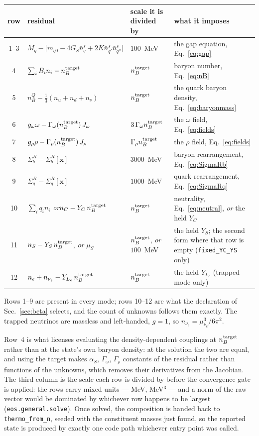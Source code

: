 \documentclass[aps,prc,onecolumn,superscriptaddress,nofootinbib,10pt]{revtex4-2}
\newcommand{\nB}{n_B}
\newcommand{\nC}{n_C}
\newcommand{\nS}{n_S}
\newcommand{\muS}{\mu_S}
\newcommand{\nbs}{\bar{n}^s}
\newcommand{\SR}{\Sigma^{R}}
\begin{document}
\begin{center}
\begin{tabular}{clll}
\toprule
row & residual & scale it is divided by & what it imposes \\
\midrule
1--3 & $M_q - \big[m_{q0} - 4G_S\nbs_q + 2K\nbs_{q'}\nbs_{q''}\big]$
     & $100$~MeV
     & the gap equation, Eq.~\eqref{eq:gap} \\
4 & $\sum_i B_i n_i - \nB^{\rm target}$
     & $\nB^{\rm target}$
     & baryon number, Eq.~\eqref{eq:nB} \\
5 & $\nB^{Q} - \tfrac13(n_u + n_d + n_s)$
     & $\nB^{\rm target}$
     & the quark baryon density, Eq.~\eqref{eq:baryonmass} \\
6 & $g_\omega\omega - \Gamma_\omega(\nB^{\rm target})\, J_\omega$
     & $3\,\Gamma_\omega \nB^{\rm target}$
     & the $\omega$ field, Eq.~\eqref{eq:fields} \\
7 & $g_\rho\rho - \Gamma_\rho(\nB^{\rm target})\, J_\rho$
     & $\Gamma_\rho \nB^{\rm target}$
     & the $\rho$ field, Eq.~\eqref{eq:fields} \\
8 & $\SR_b - \SR_b[\mathbf{x}]$
     & $3000$~MeV
     & baryon rearrangement, Eq.~\eqref{eq:SigmaRb} \\
9 & $\SR_q - \SR_q[\mathbf{x}]$
     & $1000$~MeV
     & quark rearrangement, Eq.~\eqref{eq:SigmaRq} \\
\midrule
10 & $\sum_i q_i n_i$ \quad\emph{or}\quad $\nC - Y_C\,\nB^{\rm target}$
     & $\nB^{\rm target}$
     & neutrality, Eq.~\eqref{eq:neutral}, \emph{or} the held $Y_C$ \\
11 & $\nS - Y_S\,\nB^{\rm target}$, \emph{or} $\muS$
     & $\nB^{\rm target}$, \emph{or} $100$~MeV
     & the held $Y_S$; the second form where that row is empty
       \hfill (\texttt{fixed\_YC\_YS} only) \\
12 & $n_e + n_{\nu_e} - Y_{L_e}\,\nB^{\rm target}$
     & $\nB^{\rm target}$
     & the held $Y_{L_e}$ \hfill (trapped mode only) \\
\bottomrule
\end{tabular}
\end{center}

\noindent
Rows 1--9 are present in every mode; rows 10--12 are what the declaration of
Sec.~\ref{sec:beta} selects, and the count of unknowns follows them exactly.
The trapped neutrinos are massless and left-handed, $g = 1$, so
$n_{\nu_e} = \mu_{\nu_e}^3/6\pi^2$.

Row~4 is what licenses evaluating the density-dependent couplings at
$\nB^{\rm target}$ rather than at the state's own baryon density: at the
solution the two are equal, and using the target makes
$\alpha_S$, $\Gamma_\omega$, $\Gamma_\rho$ constants of the residual rather
than functions of the unknowns, which removes their derivatives from the
Jacobian. The third column is the scale each row is divided by before the
convergence gate is applied: the rows carry mixed units --- MeV, MeV$^3$ ---
and a norm of the raw vector would be dominated by whichever row happens to be
largest (\texttt{eos.general.solve}). Once solved, the composition is handed
back to \texttt{thermo\_from\_n}, seeded with the constituent masses just
found, so the reported state is produced by exactly one code path whichever
entry point was called.
\end{document}

